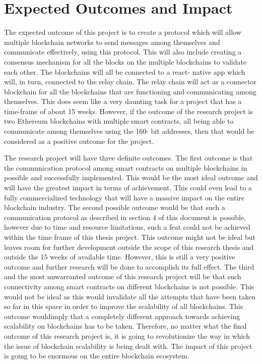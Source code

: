 \documentclass[a4paper,twoside,phd]{BYUPhys}
\begin{document}
\section{Expected Outcomes and Impact}
The expected outcome of this project is to create a protocol which will allow multiple blockchain networks to send messages among themselves and communicate effectively, using this protocol. This will also include creating a consensus mechanism for all the blocks on the multiple blockchains to validate each other. The blockchains will all be connected to a react- native app which will, in turn, connected to the relay chain. The relay chain will act as a connector blockchain for all the blockchains that are functioning and communicating among themselves. This does seem like a very daunting task for a project that has a time-frame of about 15 weeks. However, if the outcome of the research project is two Ethereum blockchains with multiple smart contracts, all being able to communicate among themselves using the 160- bit addresses, then that would be considered as a positive outcome for the project. \par
The research project will have three definite outcomes. The first outcome is that the communication protocol among smart contracts on multiple blockchains in possible and successfully implemented. This would be the most ideal outcome and will have the greatest impact in terms of achievement. This could even lead to a fully commercialized technology that will have a massive impact on the entire blockchain industry. The second possible outcome would be that such a communication protocol as described in section 4 of this document is possible, however due to time and resource limitations, such a feat could not be achieved within the time frame of this thesis project. This outcome might not be ideal but leaves room for further development outside the scope of this research thesis and outside the 15 weeks of available time. However, this is still a very positive outcome and further research will be done to accomplish its full effect. The third and the most unwarranted outcome of this research project will be that such connectivity among smart contracts on different blockchains is not possible. This would not be ideal as this would invalidate all the attempts that have been taken so far in this space in order to improve the scalability of all blockchains. This outcome wouldimply that a completely different approach towards achieving scalability on blockchains has to be taken. Therefore, no matter what the final outcome of this research project is, it is going to revolutionize the way in which the issue of blockchain scalability is being dealt with. The impact of this project is going to be enormous on the entire blockchain ecosystem. \par
\end{document}

